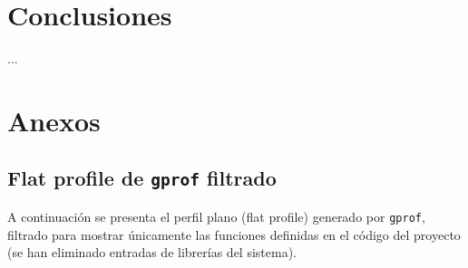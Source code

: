 \documentclass{article}
\begin{document}
\section{Conclusiones}
...

\clearpage
\appendix
\section{Anexos}

\subsection{Flat profile de \texttt{gprof} filtrado}
\label{app:flat_profile}

A continuación se presenta el perfil plano (flat profile) generado por \texttt{gprof}, filtrado para mostrar únicamente las funciones definidas en el código del proyecto (se han eliminado entradas de librerías del sistema).


\end{document}
